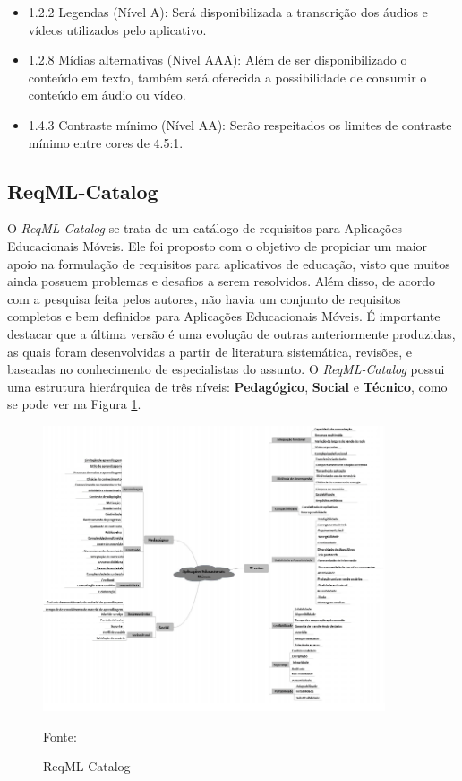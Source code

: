 \begin{itemize}
    \item 1.2.2 Legendas (Nível A): Será disponibilizada a transcrição dos áudios e vídeos utilizados pelo aplicativo.
    \item 1.2.8 Mídias alternativas (Nível AAA): Além de ser disponibilizado o conteúdo em texto, também será oferecida a possibilidade de consumir o conteúdo em áudio ou vídeo.
    \item 1.4.3 Contraste mínimo (Nível AA): Serão respeitados os limites de contraste mínimo entre cores de 4.5:1.
\end{itemize}


\subsection{ReqML-Catalog}
O \textit{ReqML-Catalog} \citep{soad2017reqml} se trata de um catálogo de requisitos para Aplicações Educacionais Móveis. Ele foi proposto com o objetivo de propiciar um maior apoio na formulação de requisitos para aplicativos de educação, visto que muitos ainda possuem problemas e desafios a serem resolvidos. Além disso, de acordo com a pesquisa feita pelos autores, não havia um conjunto de requisitos completos e bem definidos para Aplicações Educacionais Móveis. É importante destacar que a última versão é uma evolução de outras anteriormente produzidas, as quais foram desenvolvidas a partir de literatura sistemática, revisões, e baseadas no conhecimento de especialistas do assunto. 
O \textit{ReqML-Catalog} possui uma estrutura hierárquica de três níveis: \textbf{Pedagógico}, \textbf{Social} e \textbf{Técnico}, como se pode ver na Figura \ref{fig:reqML}.

\begin{figure}[H]
\centering
    \caption{ReqML-Catalog}
    \label{fig:reqML}
    \includegraphics[width=0.9\textwidth]{Figuras/reqML-catalog.png}
    
    Fonte: \cite{soad2017reqml}
\end{figure}

